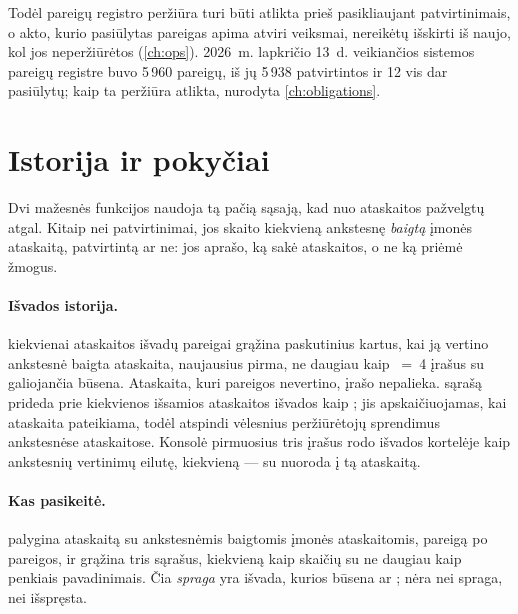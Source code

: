Todėl pareigų registro peržiūra turi būti atlikta prieš pasikliaujant patvirtinimais, o akto,
kurio pasiūlytas pareigas apima atviri veiksmai, nereikėtų išskirti iš naujo, kol jos
neperžiūrėtos (\cref{ch:ops}). 2026~m. lapkričio 13~d. veikiančios sistemos pareigų registre buvo 5\,960
pareigų, iš jų 5\,938 patvirtintos ir 12 vis dar pasiūlytų; kaip ta peržiūra atlikta, nurodyta
\cref{ch:obligations}.


\section{Istorija ir pokyčiai}\label{sec:register:history}

Dvi mažesnės funkcijos naudoja tą pačią sąsają, kad nuo ataskaitos pažvelgtų atgal. Kitaip nei
patvirtinimai, jos skaito kiekvieną ankstesnę \emph{baigtą} įmonės ataskaitą, patvirtintą ar
ne: jos aprašo, ką sakė ataskaitos, o ne ką priėmė žmogus.

\paragraph{Išvados istorija.}  kiekvienai ataskaitos išvadų pareigai
grąžina paskutinius kartus, kai ją vertino ankstesnė baigta ataskaita, naujausius pirma, ne
daugiau kaip ~=~4 įrašus  su galiojančia būsena.
Ataskaita, kuri pareigos nevertino, įrašo nepalieka.  sąrašą prideda prie
kiekvienos išsamios ataskaitos išvados kaip ; jis apskaičiuojamas, kai ataskaita
pateikiama, todėl atspindi vėlesnius peržiūrėtojų sprendimus ankstesnėse ataskaitose. Konsolė
pirmuosius tris įrašus rodo išvados kortelėje kaip ankstesnių vertinimų eilutę, kiekvieną --- su
nuoroda į tą ataskaitą.

\paragraph{Kas pasikeitė.}  palygina ataskaitą su ankstesnėmis baigtomis
įmonės ataskaitomis, pareigą po pareigos, ir grąžina tris sąrašus, kiekvieną kaip skaičių su
ne daugiau kaip penkiais pavadinimais. Čia \emph{spraga} yra išvada, kurios būsena
 ar ;  nėra nei spraga, nei išspręsta.

